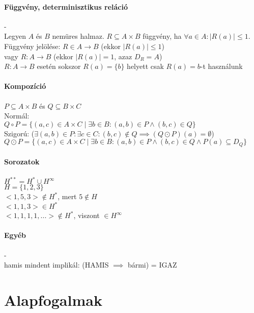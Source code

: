 \documentclass[12pt,a4paper]{article}
\begin{document}
\paragraph{Függvény, determinisztikus reláció} -\\
Legyen $A$ és $B$ nemüres halmaz.
$R \subseteq A \times B$ függvény, ha $\forall a \in A: |R(a)| \le 1$. \\
Függvény jelölése: $R \in A \to B$ (ekkor $|R(a)| \le 1$) \\
vagy $R: A \to B$ (ekkor $|R(a)| = 1$, azaz $D_R=A$) \\
$R: A \to B$ esetén sokszor $R(a)=\{b\}$ helyett csak $R(a)=b$-t használunk

\paragraph{Kompozíció} $P \subseteq A \times B$ és $Q \subseteq B \times C$\\
Normál: \\
$Q \circ P=\{(a,c) \in A \times C \;|\; \exists b \in B: (a,b) \in P \wedge (b,c) \in Q\}$\\
Szigorú: ($\exists (a,b) \in P: \exists c \in C: (b,c) \not \in Q \implies (Q \odot P)(a) = \emptyset$)\\
$Q \odot P=\{(a,c) \in A \times C \;|\; \exists b \in B: (a,b) \in P \wedge (b,c) \in Q \wedge P(a) \subseteq D_Q\}$

\paragraph{Sorozatok} $H^{**} = H^* \cup H^\infty $ \\
$H = \{1,2,3\}$ \\
$<1,5,3> \notin H^*$, mert $5 \notin H$ \\
$<1,1,3> \in H^*$ \\
$<1,1,1,1,...> \notin H^*$, viszont $\in H^\infty$ \\

\paragraph{Egyéb} -\\
hamis mindent implikál: (HAMIS $\implies$ bármi) = IGAZ

\pagebreak

\section{Alapfogalmak}
\end{document}
